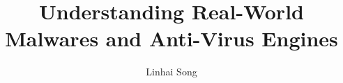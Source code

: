 \documentclass[sigconf,review,anonymous]{acmart}
\begin{document}


\title{Understanding Real-World Malwares and Anti-Virus Engines}


\author{Linhai Song}








\begin{abstract}

\end{abstract}




\maketitle






%





%
%


\balance
{

 
}
\end{document}
